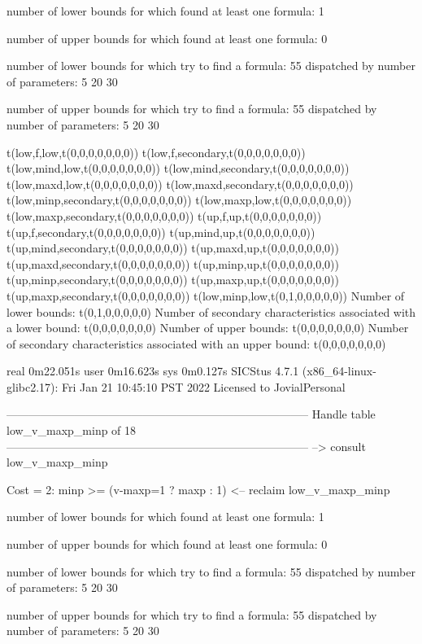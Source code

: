 number of lower bounds for which found at least one formula: 1

number of upper bounds for which found at least one formula: 0

number of lower bounds for which try to find a formula: 55
dispatched by number of parameters: 5  20  30

number of upper bounds for which try to find a formula: 55
dispatched by number of parameters: 5  20  30

t(low,f,low,t(0,0,0,0,0,0,0))
t(low,f,secondary,t(0,0,0,0,0,0,0))
t(low,mind,low,t(0,0,0,0,0,0,0))
t(low,mind,secondary,t(0,0,0,0,0,0,0))
t(low,maxd,low,t(0,0,0,0,0,0,0))
t(low,maxd,secondary,t(0,0,0,0,0,0,0))
t(low,minp,secondary,t(0,0,0,0,0,0,0))
t(low,maxp,low,t(0,0,0,0,0,0,0))
t(low,maxp,secondary,t(0,0,0,0,0,0,0))
t(up,f,up,t(0,0,0,0,0,0,0))
t(up,f,secondary,t(0,0,0,0,0,0,0))
t(up,mind,up,t(0,0,0,0,0,0,0))
t(up,mind,secondary,t(0,0,0,0,0,0,0))
t(up,maxd,up,t(0,0,0,0,0,0,0))
t(up,maxd,secondary,t(0,0,0,0,0,0,0))
t(up,minp,up,t(0,0,0,0,0,0,0))
t(up,minp,secondary,t(0,0,0,0,0,0,0))
t(up,maxp,up,t(0,0,0,0,0,0,0))
t(up,maxp,secondary,t(0,0,0,0,0,0,0))
t(low,minp,low,t(0,1,0,0,0,0,0))
Number of lower bounds:                                             t(0,1,0,0,0,0,0)
Number of secondary characteristics associated with a lower bound:  t(0,0,0,0,0,0,0)
Number of upper bounds:                                             t(0,0,0,0,0,0,0)
Number of secondary characteristics associated with an upper bound: t(0,0,0,0,0,0,0)

real	0m22.051s
user	0m16.623s
sys	0m0.127s
SICStus 4.7.1 (x86_64-linux-glibc2.17): Fri Jan 21 10:45:10 PST 2022
Licensed to JovialPersonal


--------------------------------------------------------------------------------
Handle table low_v_maxp_minp of 18
--------------------------------------------------------------------------------
--> consult low_v_maxp_minp

Cost =  2:  minp >= (v-maxp=1 ? maxp : 1)
<-- reclaim low_v_maxp_minp

number of lower bounds for which found at least one formula: 1

number of upper bounds for which found at least one formula: 0

number of lower bounds for which try to find a formula: 55
dispatched by number of parameters: 5  20  30

number of upper bounds for which try to find a formula: 55
dispatched by number of parameters: 5  20  30

